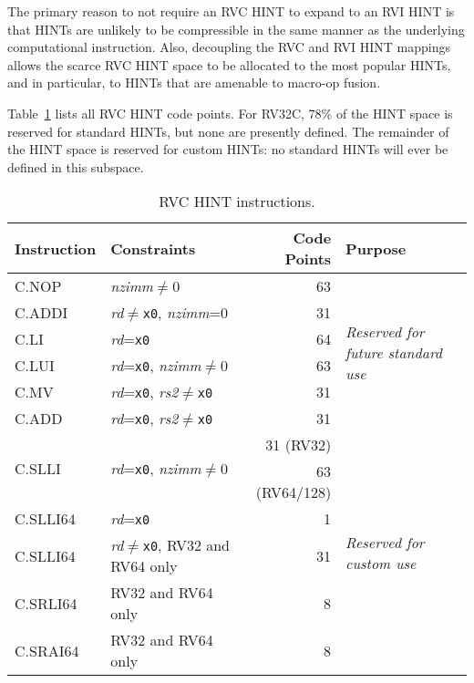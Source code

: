 \begin{commentary}
The primary reason to not require an RVC HINT to expand to an RVI HINT
is that HINTs are unlikely to be compressible in the same manner as
the underlying computational instruction.  Also, decoupling the RVC
and RVI HINT mappings allows the scarce RVC HINT space to be allocated
to the most popular HINTs, and in particular, to HINTs that are
amenable to macro-op fusion.
\end{commentary}

Table~\ref{tab:rvc-hints} lists all RVC HINT code points.  For RV32C, 78\% of
the HINT space is reserved for standard HINTs, but none are presently defined.
The remainder of the HINT space is reserved for custom HINTs: no standard
HINTs will ever be defined in this subspace.

\begin{table}[hbt]
\centering
\begin{tabular}{|l|l|r|l|}
  \hline
  Instruction             & Constraints                                 & Code Points & Purpose \\ \hline \hline
  C.NOP                   & {\em nzimm}$\neq$0                          & 63          & \multirow{6}{*}{\em Reserved for future standard use} \\ \cline{1-3}
  C.ADDI                  & {\em rd}$\neq${\tt x0}, {\em nzimm}=0       & 31          & \\ \cline{1-3}
  C.LI                    & {\em rd}={\tt x0}                           & 64          & \\ \cline{1-3}
  C.LUI                   & {\em rd}={\tt x0}, {\em nzimm}$\neq$0       & 63          & \\ \cline{1-3}
  C.MV                    & {\em rd}={\tt x0}, {\em rs2}$\neq${\tt x0}  & 31          & \\ \cline{1-3}
  C.ADD                   & {\em rd}={\tt x0}, {\em rs2}$\neq${\tt x0}  & 31          & \\ \hline \hline
  \multirow{2}{*}{C.SLLI} & \multirow{2}{*}{{\em rd}={\tt x0}, {\em nzimm}$\neq$0} & 31 (RV32)   & \multirow{6}{*}{\em Reserved for custom use} \\
                          &                                             & 63 (RV64/128) & \\ \cline{1-3}
  C.SLLI64                & {\em rd}={\tt x0}                           & 1           & \\ \cline{1-3}
  C.SLLI64                & {\em rd}$\neq${\tt x0}, RV32 and RV64 only  & 31          & \\ \cline{1-3}
  C.SRLI64                & RV32 and RV64 only                          & 8           & \\ \cline{1-3}
  C.SRAI64                & RV32 and RV64 only                          & 8           & \\ \hline
\end{tabular}
\caption{RVC HINT instructions.}
\label{tab:rvc-hints}
\end{table}


